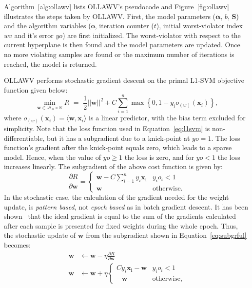 \documentclass[reqno]{vcuthesis}
\newcommand{\set}[1]{{\left\{#1\right\}}}
\newcommand{\reals}{{\mathbb{R}}}
\numberwithin{equation}{chapter}
\begin{document}
Algorithm~\ref{alg:ollawv} lists OLLAWV's pseudocode and Figure~\ref{fig:ollawv} illustrates the steps taken by OLLAWV. First, the model parameters ($\bm \alpha$, $b$, $\bm S$) and the algorithm variables ($\bm o$, iteration counter ($t$), initial worst-violator index $wv$ and it's error $yo$) are first initialized. The worst-violator with respect to the current hyperplane is then found and the model parameters are updated. Once no more violating samples are found or the maximum number of iterations is reached, the model is returned.

OLLAWV performs stochastic gradient descent on the primal L1-SVM objective function given below:
\begin{equation}
\label{eq:l1svm}
\min\limits_{\bm{w} \in \mathcal{H}_o \times \reals} R {\,\,} = {\,\,} \frac{1}{2}||\bm{w}||^2 + C\sum_{i=1}^n \max \set{0, 1 - y_i o_{(w)}(\bm{x}_i)},
\end{equation}
where $o_{(w)}(\bm{x}_i) = \langle\bm w, \bm x_i\rangle$ is a linear predictor, with the bias term excluded for simplicity. Note that the loss function used in Equation~\ref{eq:l1svm} is non-differentiable, but it has a subgradient due to a knick-point at $yo = 1$. The loss function's gradient after the knick-point equals zero, which leads to a sparse model. Hence, when the value of $yo \geq 1$ the loss is zero, and for $yo < 1$ the loss increases linearly. The subgradient of the above cost function is given by:
\begin{equation}
\label{eq:subgrful}
\frac{\partial R}{\partial \bm w} = \begin{cases} 
						\bm w - C \sum_{i=1}^n y_i \bm{x_i} & y_i o_i < 1 \\
						\bm w & \text{otherwise.}
						\end{cases}
\end{equation}
In the stochastic case, the calculation of the gradient needed for the weight update, is \textit{pattern based}, not \textit{epoch based} as in batch gradient descent. It has been shown~\cite{Kecman2001} that the ideal gradient is equal to the sum of the gradients calculated after each sample is presented for fixed weights during the whole epoch. Thus, the stochastic update of $\bm w$ from the subgradient shown in Equation~\ref{eq:subgrful} becomes:
\begin{align*}
\bm w &\leftarrow \bm w - \eta \frac{\partial R}{\partial \bm w} \\
\bm w &\leftarrow \bm w + \eta \begin{cases} 
															C y_i \bm{x_i} - \bm w & y_i o_i < 1 \\
															-\bm w & \text{otherwise},
													 \end{cases}
\end{align*}
\end{document}
